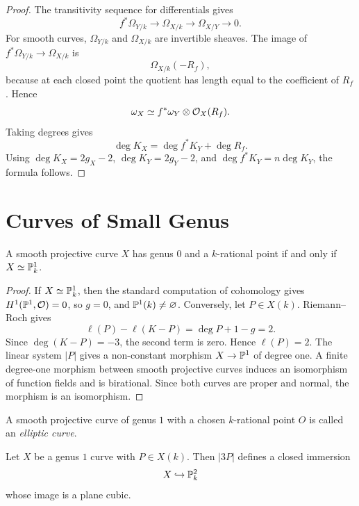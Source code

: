 \begin{proof}
The transitivity sequence for differentials gives
\[
    f^*\Omega_{Y/k}\longrightarrow \Omega_{X/k}
    \longrightarrow \Omega_{X/Y}\longrightarrow0.
\]
For smooth curves, \(\Omega_{Y/k}\) and \(\Omega_{X/k}\) are invertible sheaves.
The image of \(f^*\Omega_{Y/k}\to\Omega_{X/k}\) is
\[
    \Omega_{X/k}(-R_f),
\]
because at each closed point the quotient has length equal to the coefficient
of \(R_f\).  Hence
\[
    \omega_X\simeq f^*\omega_Y\otimes\mathcal{O}_X(R_f).
\]
Taking degrees gives
\[
    \deg K_X=\deg f^*K_Y+\deg R_f.
\]
Using \(\deg K_X=2g_X-2\), \(\deg K_Y=2g_Y-2\), and
\(\deg f^*K_Y=n\deg K_Y\), the formula follows.
\end{proof}

\section{Curves of Small Genus}

\begin{proposition}
A smooth projective curve \(X\) has genus \(0\) and a \(k\)-rational point if
and only if \(X\simeq\mathbb{P}^1_k\).
\end{proposition}

\begin{proof}
If \(X\simeq\mathbb{P}^1_k\), then the standard computation of cohomology gives
\(H^1(\mathbb{P}^1,\mathcal{O})=0\), so \(g=0\), and \(\mathbb{P}^1(k)\ne\varnothing\).
Conversely, let \(P\in X(k)\).  Riemann--Roch gives
\[
    \ell(P)-\ell(K-P)=\deg P+1-g=2.
\]
Since \(\deg(K-P)=-3\), the second term is zero.  Hence \(\ell(P)=2\).  The
linear system \(|P|\) gives a non-constant morphism \(X\to\mathbb{P}^1\) of degree
one.  A finite degree-one morphism between smooth projective curves induces an
isomorphism of function fields and is birational.  Since both curves are
proper and normal, the morphism is an isomorphism.
\end{proof}

\begin{definition}
A smooth projective curve of genus \(1\) with a chosen \(k\)-rational point
\(O\) is called an \emph{elliptic curve}.
\end{definition}

\begin{proposition}
Let \(X\) be a genus \(1\) curve with \(P\in X(k)\).  Then \(|3P|\) defines a
closed immersion
\[
    X\hookrightarrow \mathbb{P}^2_k
\]
whose image is a plane cubic.
\end{proposition}

